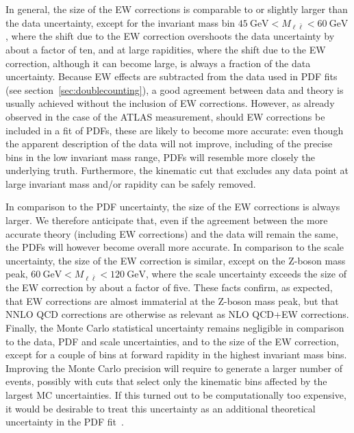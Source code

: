 In general, the size of the EW corrections is comparable to or slightly larger
than the data uncertainty, except for the invariant mass bin 
$\SI{45}{\giga\electronvolt}<M_{\ell\bar\ell}<\SI{60}{\giga\electronvolt}$,
where the shift due to the EW correction overshoots the data uncertainty by
about a factor of ten, and at large rapidities, where the shift due to the EW
correction, although it can become large, is always a fraction of the data
uncertainty. Because EW effects are subtracted from the data used
in PDF fits (see section~\ref{sec:doublecounting}), a good agreement between
data and theory is usually achieved without the inclusion of EW corrections.
However, as already observed in the case of the ATLAS measurement, should EW
corrections be included in a fit of PDFs, these are likely to become more
accurate: even though the apparent description of the data will not
improve, including of the precise bins in the low invariant mass range, PDFs
will resemble more closely the underlying truth. Furthermore, the kinematic cut
that excludes any data point at large invariant mass and/or rapidity can be
safely removed.

In comparison to the PDF uncertainty, the size of the EW corrections is always
larger. We therefore anticipate that, even if the agreement between the more
accurate theory (including EW corrections) and the data will remain the same,
the PDFs will however become overall more accurate. In comparison to the scale
uncertainty, the size of the EW correction is similar, except on the Z-boson
mass peak, $\SI{60}{\giga\electronvolt}<M_{\ell\bar\ell}<\SI{120}{\giga\electronvolt}$, where the scale uncertainty exceeds
the size of the EW correction by about a factor of five. These facts confirm,
as expected, that EW corrections are almost immaterial at the Z-boson mass
peak, but that NNLO QCD corrections are otherwise as relevant as NLO QCD+EW
corrections. Finally, the Monte Carlo statistical uncertainty remains negligible
in comparison to the data, PDF and scale uncertainties, and to the size of the
EW correction, except for a couple of bins at forward rapidity in the highest
invariant mass bins. Improving the Monte Carlo precision will require to
generate a larger number of events, possibly with cuts that select
only the kinematic bins affected by the largest MC uncertainties. If this
turned out to be computationally too expensive, it would be desirable to treat
this uncertainty as an additional theoretical uncertainty in the PDF
fit~\cite{Ball:2018lag}.


